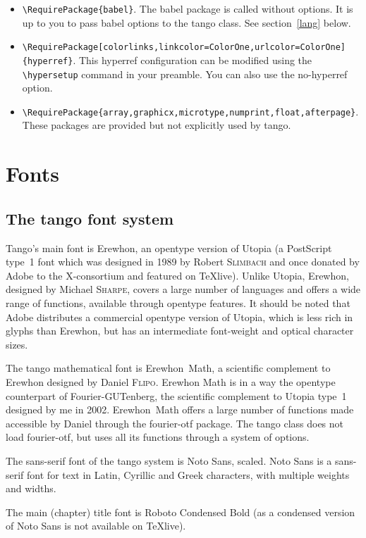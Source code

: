 \documentclass[english,ColorTheme=Red,FontSize=10pt]{tango}
\newcommand\TO[1]{\textsf{#1}}
\begin{document}
\begin{itemize}
\item\verb=\RequirePackage{babel}=. The babel package is called without options. It is up to you to pass babel options to the tango class. See section~\ref{lang} below.
\item\verb+\RequirePackage[colorlinks,linkcolor=ColorOne,urlcolor=ColorOne]{hyperref}+. This \TO{hyperref} configuration can be modified using the \verb=\hypersetup= command in your preamble. You can also use the \TO{no-hyperref} option.
\item\verb=\RequirePackage{array,graphicx,microtype,numprint,float,afterpage}=. These packages are provided but not explicitly used by tango.
\end{itemize}


\section{Fonts}\label{fnts}

\subsection{The tango font system}
Tango's main font is Erewhon, an opentype version of Utopia (a PostScript type~1 font which was designed in 1989 by Robert \textsc{Slimbach} and once donated by Adobe to the X-consortium and featured on TeXlive). Unlike Utopia, Erewhon, designed by Michael \textsc{Sharpe}, covers a large number of languages and offers a wide range of functions, available through opentype features. It should be noted that Adobe distributes a commercial opentype version of Utopia, which is less rich in glyphs than Erewhon, but has an intermediate font-weight and optical character sizes.

The tango mathematical font is Erewhon~Math, a scientific complement to Erewhon designed by Daniel \textsc{Flipo}. Erewhon Math is in a way the opentype counterpart of Fourier-GUTenberg, the scientific complement to Utopia type~1 designed by me in 2002. Erewhon~Math offers a large number of functions made accessible by Daniel through the \TO{fourier-otf} package. The tango class does not load \TO{fourier-otf}, but uses all its functions through a system of options.

The sans-serif font of the tango system is Noto Sans, scaled. Noto Sans is a sans-serif font for text in Latin, Cyrillic and Greek characters, with multiple weights and widths. 

The main (chapter) title font is Roboto Condensed Bold (as a condensed version of Noto Sans is not available on TeXlive).
\end{document}
